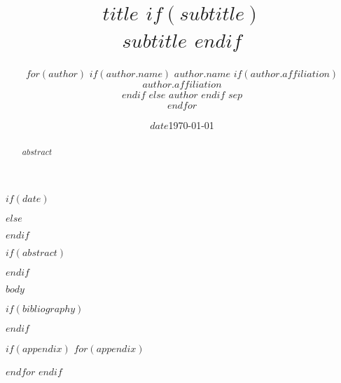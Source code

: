 \documentclass[12pt]{article}
\begin{document}
\title{\textsf{\LARGE $title$ $if(subtitle)$ \\\medskip $subtitle$ $endif$}}
\author{$for(author)$ $if(author.name)$ $author.name$ $if(author.affiliation)$ \\ $author.affiliation$ \\ $endif$ $else$ $author$ $endif$ $sep$ \\ $endfor$}

$if(date)$ \date{$date$} $else$ \date{\today} $endif$

\maketitle

\newpage

$if(abstract)$
\begin{abstract}
$abstract$
\end{abstract}
\newpage
$endif$

$body$

$if(bibliography)$


$endif$


$if(appendix)$
\appendix
$for(appendix)$

$endfor$
$endif$
\end{document}
